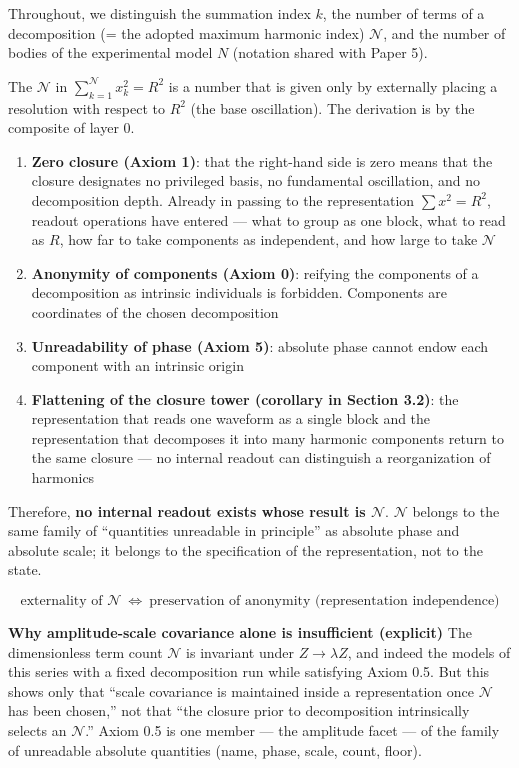 \documentclass[
  a4paper,
]{article}
\providecommand{\tightlist}{%
  \setlength{\itemsep}{0pt}\setlength{\parskip}{0pt}}
\begin{document}
Throughout, we distinguish the summation index \(k\), the number of
terms of a decomposition (= the adopted maximum harmonic index)
\(\mathcal N\), and the number of bodies of the experimental model \(N\)
(notation shared with Paper 5).

The \(\mathcal N\) in \(\sum_{k=1}^{\mathcal N} x_k^2 = R^2\) is a
number that is given only by externally placing a resolution with
respect to \(R^2\) (the base oscillation). The derivation is by the
composite of layer 0.

\begin{enumerate}
\def\labelenumi{\arabic{enumi}.}
\tightlist
\item
  \textbf{Zero closure (Axiom 1)}: that the right-hand side is zero
  means that the closure designates no privileged basis, no fundamental
  oscillation, and no decomposition depth. Already in passing to the
  representation \(\sum x^2=R^2\), readout operations have entered ---
  what to group as one block, what to read as \(R\), how far to take
  components as independent, and how large to take \(\mathcal N\)
\item
  \textbf{Anonymity of components (Axiom 0)}: reifying the components of
  a decomposition as intrinsic individuals is forbidden. Components are
  coordinates of the chosen decomposition
\item
  \textbf{Unreadability of phase (Axiom 5)}: absolute phase cannot endow
  each component with an intrinsic origin
\item
  \textbf{Flattening of the closure tower (corollary in Section 3.2)}:
  the representation that reads one waveform as a single block and the
  representation that decomposes it into many harmonic components return
  to the same closure --- no internal readout can distinguish a
  reorganization of harmonics
\end{enumerate}

Therefore, \textbf{no internal readout exists whose result is
\(\mathcal N\)}. \(\mathcal N\) belongs to the same family of
``quantities unreadable in principle'' as absolute phase and absolute
scale; it belongs to the specification of the representation, not to the
state.

\[
\boxed{\ \text{externality of }\mathcal N\ \Longleftrightarrow\ \text{preservation of anonymity (representation independence)}\ }
\]

\textbf{Why amplitude-scale covariance alone is insufficient (explicit)}
The dimensionless term count \(\mathcal N\) is invariant under
\(Z\to\lambda Z\), and indeed the models of this series with a fixed
decomposition run while satisfying Axiom 0.5. But this shows only that
``scale covariance is maintained inside a representation once
\(\mathcal N\) has been chosen,'' not that ``the closure prior to
decomposition intrinsically selects an \(\mathcal N\).'' Axiom 0.5 is
one member --- the amplitude facet --- of the family of unreadable
absolute quantities (name, phase, scale, count, floor).
\end{document}

